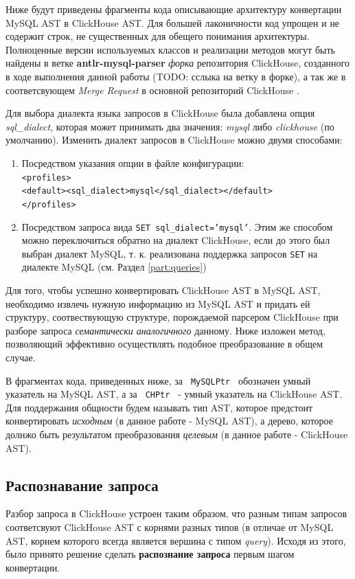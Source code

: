 Ниже будут приведены фрагменты кода описывающие архитектуру конвертации MySQL AST в ClickHouse AST. Для большей лаконичности код упрощен и не содержит строк, не существенных для обещего понимания архитектуры. Полноценные версии используемых классов и реализации методов могут быть найдены в ветке \textbf{antlr-mysql-parser} \textit{форка} репозитория ClickHouse, созданного в ходе выполнения данной работы (TODO: сслыка на ветку в форке), а так же в соответсвующем \textit{Merge Request} в основной репозиторий ClickHouse \cite{merge_request}.

Для выбора диалекта языка запросов в ClickHouse была добавлена опция \textit{sql\_dialect}, которая может принимать два значения: \textit{mysql} либо \textit{clickhouse} (по умолчанию). Изменить диалект запросов в ClickHouse можно двумя способами:

\begin{enumerate}
    \item Посредством указания опции в файле конфигурации:\\ \texttt{<profiles>}\\\texttt{<default><sql_dialect>mysql</sql_dialect></default>}\\ \texttt{</profiles>}
    \item Посредством запроса вида \texttt{SET sql_dialect='mysql'}. Этим же способом можно переключиться обратно на диалект ClickHouse, если до этого был выбран диалект MySQL, т. к. реализована поддержка запросов \texttt{SET} на диалекте MySQL (см. Раздел \ref{part:queries})
\end{enumerate}

Для того, чтобы успешно конвертировать ClickHouse AST в MySQL AST, необходимо извлечь нужную информацию из MySQL AST и придать ей структуру, соотвествующую структуре, порождаемой парсером ClickHouse при разборе запроса \textit{семантически аналогичного} данному. Ниже изложен метод, позволяющий эффективно осуществлять подобное преобразование в общем случае.

В фрагментах кода, приведенных ниже, за \texttt{ MySQLPtr } обозначен умный указатель на MySQL AST, а за \texttt{ CHPtr } - умный указатель на ClickHouse AST. Для поддержания общности будем называть тип AST, которое предстоит конвертировать \textit{исходным} (в данное работе - MySQL AST), а дерево, которое долнжо быть результатом преобразования \textit{целевым} (в данное работе - ClickHouse AST).

\subsection{Распознавание запроса} \label{conv:recognizer_}
Разбор запроса в ClickHouse устроен таким образом, что разным типам запросов соответсвуют ClickHouse AST с корнями разных типов (в отличае от MySQL AST, корнем которого всегда является вершина с типом \textit{query}). Исходя из этого, было принято решение сделать \textbf{распознание запроса} первым шагом конвертации.

